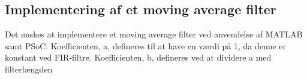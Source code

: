 \subsection{Implementering af et moving average filter}

Det ønskes at implementere et moving average filter ved anvendelse af MATLAB samt PSoC. Koefficienten, a, defineres til at have en værdi på 1, da denne er konstant ved FIR-filtre. Koefficienten, b, defineres ved at dividere a med filterlængden 